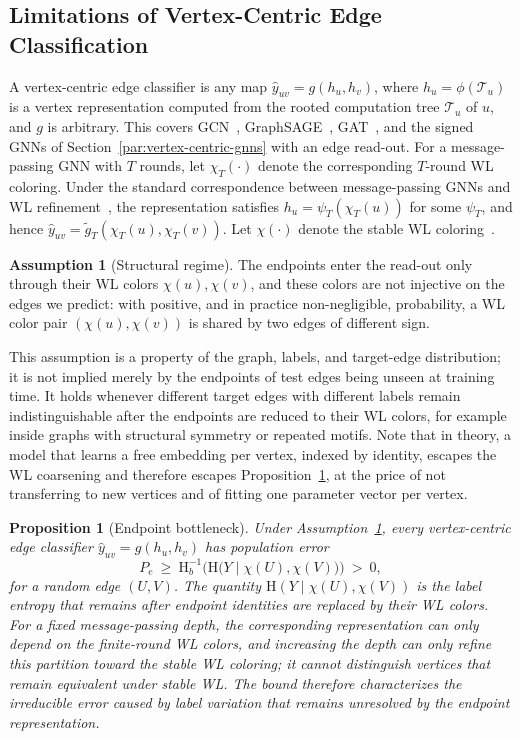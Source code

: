 \documentclass[sigconf, review, anonymous]{acmart}
\newcommand{\Hh}{\mathrm{H}}
\theoremstyle{plain}
\newtheorem{proposition}{Proposition}
\theoremstyle{definition}
\newtheorem{assumption}{Assumption}
\begin{document}
\subsection{Limitations of Vertex-Centric Edge Classification}
A vertex-centric edge classifier is any map $\hat y_{uv}=g(h_u,h_v)$, where $h_u=\phi(\mathcal{T}_u)$ is a vertex representation computed from the rooted computation tree $\mathcal{T}_u$ of $u$, and $g$ is arbitrary. This covers GCN~\citep{kipf2017semi}, GraphSAGE~\citep{hamilton2017inductive}, GAT~\citep{velickovic2018graph}, and the signed GNNs of Section~\ref{par:vertex-centric-gnns} with an edge read-out. For a message-passing GNN with $T$ rounds, let $\chi_T(\cdot)$ denote the corresponding $T$-round WL coloring. Under the standard correspondence between message-passing GNNs and WL refinement~\citep{xu2019powerful, morris2019weisfeiler}, the representation satisfies $h_u=\psi_T(\chi_T(u))$ for some $\psi_T$, and hence $\hat y_{uv}=\tilde g_T(\chi_T(u),\chi_T(v))$. Let $\chi(\cdot)$ denote the stable WL coloring~\citep{weisfeiler1968reduction}. 

\begin{assumption}[Structural regime]
\label{as:structural}
The endpoints enter the read-out only through their WL colors $\chi(u),\chi(v)$, and these colors are not injective on the edges we predict: with positive, and in practice non-negligible, probability, a WL color pair $(\chi(u),\chi(v))$ is shared by two edges of different sign.
\end{assumption}

This assumption is a property of the graph, labels, and target-edge distribution; it is not implied merely by the endpoints of test edges being unseen at training time. It holds whenever different target edges with different labels remain indistinguishable after the endpoints are reduced to their WL colors, for example inside graphs with structural symmetry or repeated motifs. Note that in theory, a model that learns a free embedding per vertex, indexed by identity, escapes the WL coarsening and therefore escapes Proposition~\ref{prop:bottleneck}, at the price of not transferring to new vertices and of fitting one parameter vector per vertex.

\begin{proposition}[Endpoint bottleneck]
\label{prop:bottleneck}
Under Assumption~\ref{as:structural}, every vertex-centric edge classifier $\hat y_{uv}=g(h_u,h_v)$ has population error
\[
P_e \ \ge\ \Hh_b^{-1}\Big(\Hh\big(Y\mid \chi(U),\chi(V)\big)\Big)\ >\ 0,
\]
for a random edge $(U,V)$. The quantity $\Hh(Y\mid \chi(U),\chi(V))$ is the label entropy that remains after endpoint identities are replaced by their WL colors. For a fixed message-passing depth, the corresponding representation can only depend on the finite-round WL colors, and increasing the depth can only refine this partition toward the stable WL coloring; it cannot distinguish vertices that remain equivalent under stable WL. The bound therefore characterizes the irreducible error caused by label variation that remains unresolved by the endpoint representation. \end{proposition}
\end{document}
